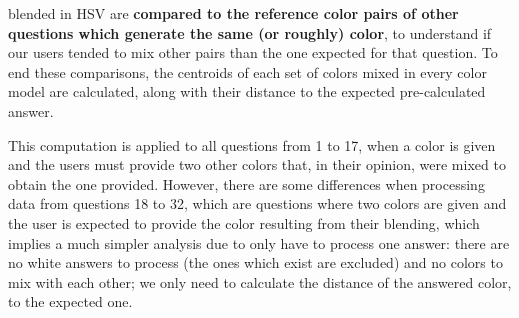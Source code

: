 blended in HSV are \textbf{compared to the reference color pairs of other questions which generate the same (or roughly) color}, to understand if our users tended to mix other pairs
than the one expected for that question. To end these comparisons, the centroids of each set of colors mixed in every color model are calculated, along with their distance to the expected
pre-calculated answer. \par
%
This computation is applied to all questions from 1 to 17, when a color is given and the users must provide two other colors that, in their opinion, were mixed to obtain the one provided.
However, there are some differences when processing data from questions 18 to 32, which are questions where two colors are given and the user is expected to provide the color resulting from their blending, which
implies a much simpler analysis due to only have to process one answer: there are no white answers to process (the ones which exist are excluded) and no colors to mix with each other; we only need to calculate
the distance of the answered color, to the expected one.
%
